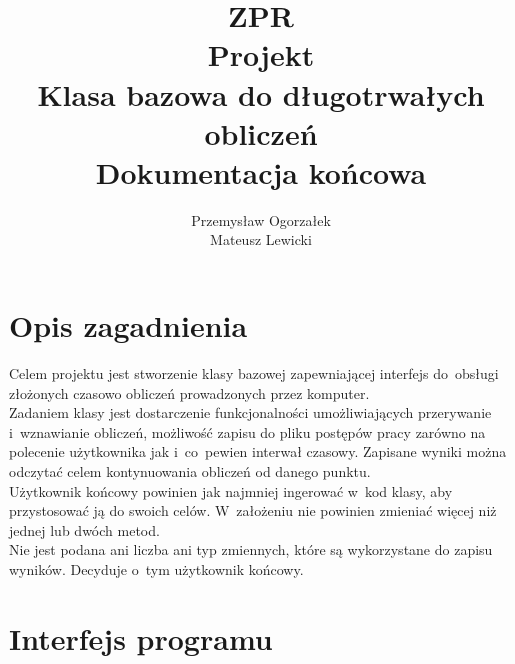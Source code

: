 \documentclass[a4paper]{article}
\author{Przemysław Ogorzałek\\Mateusz Lewicki}
\title{ZPR\\Projekt\\Klasa bazowa do długotrwałych obliczeń\\Dokumentacja końcowa}
\begin{document}
\maketitle
\section{Opis zagadnienia}
Celem projektu jest stworzenie klasy bazowej zapewniającej interfejs do~obsługi złożonych czasowo obliczeń prowadzonych przez komputer.\\
Zadaniem klasy jest dostarczenie funkcjonalności umożliwiających przerywanie i~wznawianie obliczeń, możliwość zapisu do pliku postępów pracy zarówno na polecenie użytkownika jak i~co~pewien interwał czasowy. 
Zapisane wyniki można odczytać celem kontynuowania obliczeń od danego punktu.\\
Użytkownik końcowy powinien jak najmniej ingerować w~kod klasy, aby przystosować ją do swoich celów.
W~założeniu nie powinien zmieniać więcej niż jednej lub dwóch metod.\\
Nie jest podana ani liczba ani typ zmiennych, które są wykorzystane do zapisu wyników.
Decyduje o~tym użytkownik końcowy.
\section{Interfejs programu}
\end{document}
